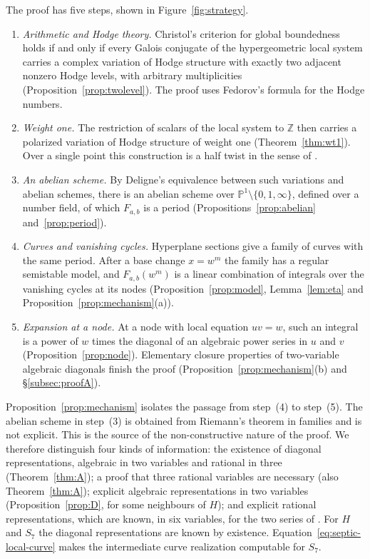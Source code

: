 \documentclass[11pt]{amsart}
\theoremstyle{definition}
\theoremstyle{remark}
\numberwithin{equation}{section}
\newcommand{\Z}{\mathbb{Z}}
\newcommand{\PP}{\mathbb{P}}
\newcommand{\Fab}{F_{a,b}}
\begin{document}
The proof has five steps, shown in Figure~\ref{fig:strategy}.
\begin{enumerate}[label=(\arabic*),leftmargin=2em]
\item \emph{Arithmetic and Hodge theory.} Christol's criterion for global boundedness holds if and only if every Galois conjugate of the hypergeometric local system carries a complex variation of Hodge structure with exactly two adjacent nonzero Hodge levels, with arbitrary multiplicities (Proposition~\ref{prop:twolevel}). The proof uses Fedorov's formula for the Hodge numbers.
\item \emph{Weight one.} The restriction of scalars of the local system to $\Z$ then carries a polarized variation of Hodge structure of weight one (Theorem~\ref{thm:wt1}). Over a single point this construction is a half twist in the sense of \citet{vanGeemen2001}.
\item \emph{An abelian scheme.} By Deligne's equivalence between such variations and abelian schemes, there is an abelian scheme over $\PP^1\setminus\{0,1,\infty\}$, defined over a number field, of which $\Fab$ is a period (Propositions~\ref{prop:abelian} and~\ref{prop:period}).
\item \emph{Curves and vanishing cycles.} Hyperplane sections give a family of curves with the same period. After a base change $x=w^m$ the family has a regular semistable model, and $\Fab(w^m)$ is a linear combination of integrals over the vanishing cycles at its nodes (Proposition~\ref{prop:model}, Lemma~\ref{lem:eta} and Proposition~\ref{prop:mechanism}(a)).
\item \emph{Expansion at a node.} At a node with local equation $uv=w$, such an integral is a power of $w$ times the diagonal of an algebraic power series in $u$ and $v$ (Proposition~\ref{prop:node}). Elementary closure properties of two-variable algebraic diagonals finish the proof (Proposition~\ref{prop:mechanism}(b) and \S\ref{subsec:proofA}).
\end{enumerate}
Proposition~\ref{prop:mechanism} isolates the passage from step~(4) to step~(5). The abelian scheme in step~(3) is obtained from Riemann's theorem in families and is not explicit. This is the source of the non-constructive nature of the proof. We therefore distinguish four kinds of information: the existence of diagonal representations, algebraic in two variables and rational in three (Theorem~\ref{thm:A}); a proof that three rational variables are necessary (also Theorem~\ref{thm:A}); explicit algebraic representations in two variables (Proposition~\ref{prop:D}, for some neighbours of $H$); and explicit rational representations, which are known, in six variables, for the two series of \citet{AbdelazizKoutschanMaillard2020}. For $H$ and $S_7$ the diagonal representations are known by existence. Equation~\eqref{eq:septic-local-curve} makes the intermediate curve realization computable for $S_7$.
\end{document}
